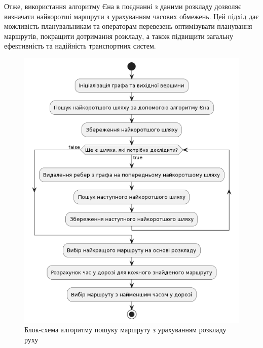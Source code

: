 Отже, використання алгоритму Єна в поєднанні з даними розкладу дозволяє визначати найкоротші маршрути з урахуванням часових обмежень. Цей підхід дає можливість планувальникам та операторам перевезень оптимізувати планування маршрутів, покращити дотримання розкладу, а також підвищити загальну ефективність та надійність транспортних систем.

\begin{figure}[h]
    \centering
    \includegraphics[scale=0.6]{content/chapters/2-implementation-methods/assets/img/timed_search_algorithm.png}
    \caption{Блок-схема алгоритму пошуку маршруту з урахуванням розкладу руху}
    \label{fig:timed_search}
\end{figure}

% 
